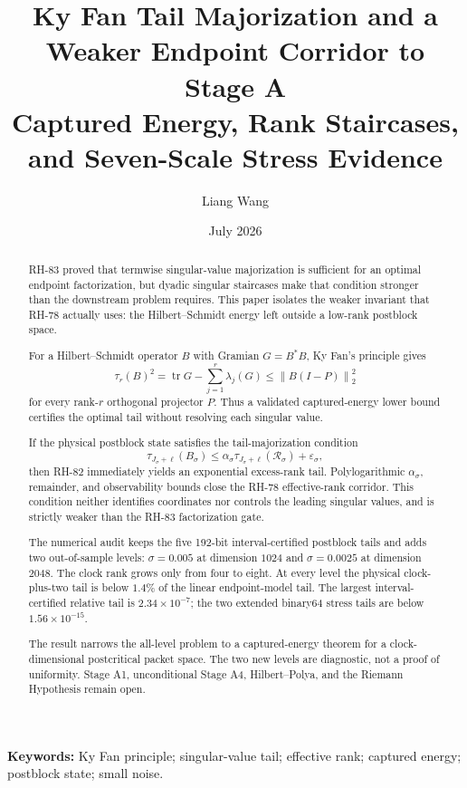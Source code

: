 \documentclass[11pt]{article}
\title{Ky Fan Tail Majorization and a Weaker Endpoint Corridor to Stage A\\
\large Captured Energy, Rank Staircases, and Seven-Scale Stress Evidence}
\author{Liang Wang}
\date{July 2026}
\theoremstyle{remark}
\newcommand{\norm}[1]{\left\lVert#1\right\rVert}
\newcommand{\cR}{\mathcal R}
\begin{document}
\maketitle

\begin{abstract}
RH-83 proved that termwise singular-value majorization is sufficient for an
optimal endpoint factorization, but dyadic singular staircases make that
condition stronger than the downstream problem requires.  This paper isolates
the weaker invariant that RH-78 actually uses: the Hilbert--Schmidt energy
left outside a low-rank postblock space.

For a Hilbert--Schmidt operator $B$ with Gramian $G=B^*B$, Ky Fan's principle
gives
\[
 \tau_r(B)^2
 =\operatorname{tr}G-\sum_{j=1}^r\lambda_j(G)
 \le \norm{B(I-P)}_2^2
\]
for every rank-$r$ orthogonal projector $P$.  Thus a validated captured-energy
lower bound certifies the optimal tail without resolving each singular value.

If the physical postblock state satisfies the tail-majorization condition
\[
 \tau_{J_\sigma+\ell}(B_\sigma)
 \le \alpha_\sigma
 \tau_{J_\sigma+\ell}(\cR_\sigma)+\varepsilon_\sigma,
\]
then RH-82 immediately yields an exponential excess-rank tail.  Polylogarithmic
$\alpha_\sigma$, remainder, and observability bounds close the RH-78
effective-rank corridor.  This condition neither identifies coordinates nor
controls the leading singular values, and is strictly weaker than the RH-83
factorization gate.

The numerical audit keeps the five 192-bit interval-certified postblock tails
and adds two out-of-sample levels: $\sigma=0.005$ at dimension $1024$ and
$\sigma=0.0025$ at dimension $2048$.  The clock rank grows only from four to
eight.  At every level the physical clock-plus-two tail is below $1.4\%$ of
the linear endpoint-model tail.  The largest interval-certified relative
tail is $2.34\times10^{-7}$; the two extended binary64 stress tails are below
$1.56\times10^{-15}$.

The result narrows the all-level problem to a captured-energy theorem for a
clock-dimensional postcritical packet space.  The two new levels are
diagnostic, not a proof of uniformity.  Stage A1, unconditional Stage A4,
Hilbert--Polya, and the Riemann Hypothesis remain open.
\end{abstract}

\noindent\textbf{Keywords:} Ky Fan principle; singular-value tail; effective
rank; captured energy; postblock state; small noise.
\end{document}
